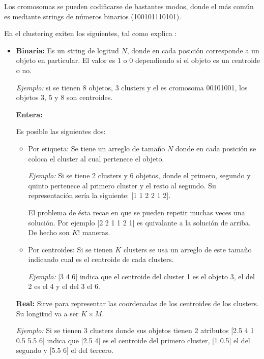 Los cromosomas se pueden codificarse de bastantes modos, donde el m\'as 
com\'un es mediante strings de n\'umeros binarios (100101110101).

En el clustering exiten los siguientes, tal como explica \cite{HrCaFr2009}:

\begin{itemize}

\item {\bf Binar\'ia:} Es un string de logitud $N$, donde en cada posici\'on
corresponde a un objeto en particular. El valor es 1 o 0 dependiendo si 
el objeto es un centroide o no.

{\em Ejemplo:} si se tienen 8 objetos, 3 clusters y el es cromosoma 00101001, los objetos 3, 5 y 8
son centroides.

{\bf Entera:}

Es posible las siguientes dos:

\begin{itemize}

\item Por etiqueta: Se tiene un arreglo de tama\~no $N$ donde en cada posici\'on
se coloca el cluster al cual pertenece el objeto.

{\em Ejemplo:} Si se tiene 2 clusters y 6 objetos, donde el primero, segundo 
y quinto pertenece al primero cluster y el resto al segundo. Su representaci\'on
ser\'ia la siguiente: [1 1 2 2 1 2].

El problema de \'esta recae en que se pueden repetir muchas veces una soluci\'on.
Por ejemplo [2 2 1 1 2 1] es quivalante a la soluci\'on de arriba. De hecho son
$K!$ maneras.

\item Por centroides: Si se tienen $K$ clusters se usa un arreglo de este tama\~no
indicando cual es el centroide de cada clusters.

{\em Ejemplo:} [3 4 6] indica que el centroide del cluster 1 es el objeto 3, el del
2 es el 4 y el del 3 el 6.

\end{itemize}

{\bf Real:} Sirve para representar las coordenadas de los centroides de los clusters.
Su longitud va a ser $K \times M$.

{\em Ejemplo:} Si se tienen 3 clusters donde sus objetos tienen 2 atributos [2.5 4 1 0.5 5.5 6]
indica que [2.5 4] es el centroide del primero cluster, [1 0.5] el del segundo y 
[5.5 6] el del tercero. 

\end{itemize}

